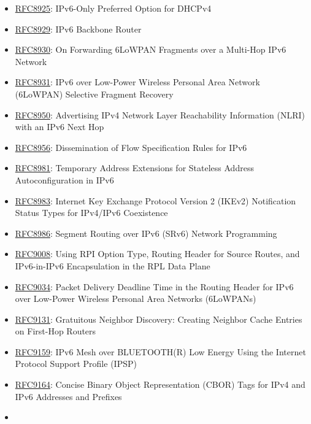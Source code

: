 \documentclass[
]{article}
\begin{document}
\begin{itemize}
\item
  \href{https://www.rfc-editor.org/info/rfc8925}{RFC8925}: IPv6-Only
  Preferred Option for DHCPv4
\item
  \href{https://www.rfc-editor.org/info/rfc8929}{RFC8929}: IPv6 Backbone
  Router
\item
  \href{https://www.rfc-editor.org/info/rfc8930}{RFC8930}: On Forwarding
  6LoWPAN Fragments over a Multi-Hop IPv6 Network
\item
  \href{https://www.rfc-editor.org/info/rfc8931}{RFC8931}: IPv6 over
  Low-Power Wireless Personal Area Network (6LoWPAN) Selective Fragment
  Recovery
\item
  \href{https://www.rfc-editor.org/info/rfc8950}{RFC8950}: Advertising
  IPv4 Network Layer Reachability Information (NLRI) with an IPv6 Next
  Hop
\item
  \href{https://www.rfc-editor.org/info/rfc8956}{RFC8956}: Dissemination
  of Flow Specification Rules for IPv6
\item
  \href{https://www.rfc-editor.org/info/rfc8981}{RFC8981}: Temporary
  Address Extensions for Stateless Address Autoconfiguration in IPv6
\item
  \href{https://www.rfc-editor.org/info/rfc8983}{RFC8983}: Internet Key
  Exchange Protocol Version 2 (IKEv2) Notification Status Types for
  IPv4/IPv6 Coexistence
\item
  \href{https://www.rfc-editor.org/info/rfc8986}{RFC8986}: Segment
  Routing over IPv6 (SRv6) Network Programming
\item
  \href{https://www.rfc-editor.org/info/rfc9008}{RFC9008}: Using RPI
  Option Type, Routing Header for Source Routes, and IPv6-in-IPv6
  Encapsulation in the RPL Data Plane
\item
  \href{https://www.rfc-editor.org/info/rfc9034}{RFC9034}: Packet
  Delivery Deadline Time in the Routing Header for IPv6 over Low-Power
  Wireless Personal Area Networks (6LoWPANs)
\item
  \href{https://www.rfc-editor.org/info/rfc9131}{RFC9131}: Gratuitous
  Neighbor Discovery: Creating Neighbor Cache Entries on First-Hop
  Routers
\item
  \href{https://www.rfc-editor.org/info/rfc9159}{RFC9159}: IPv6 Mesh
  over BLUETOOTH(R) Low Energy Using the Internet Protocol Support
  Profile (IPSP)
\item
  \href{https://www.rfc-editor.org/info/rfc9164}{RFC9164}: Concise
  Binary Object Representation (CBOR) Tags for IPv4 and IPv6 Addresses
  and Prefixes
\item

\end{itemize}
\end{document}
